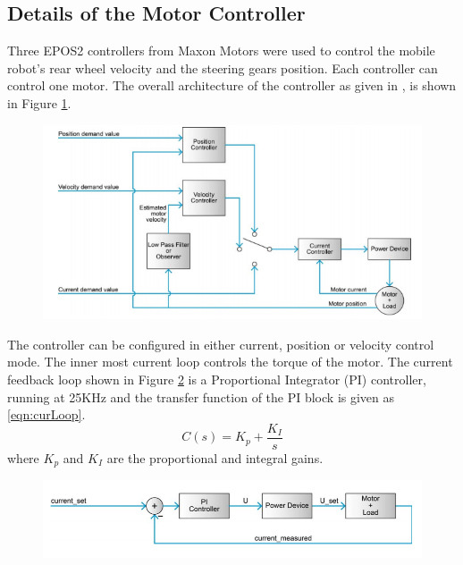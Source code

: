\subsection{Details of the Motor Controller}
Three EPOS2 controllers from Maxon Motors were used to control the mobile robot's rear wheel velocity and the steering gears position. Each controller can control one motor. The overall architecture of the controller  as given in \cite{maxonAutoTune}, \cite{maxonAppNotesPosition}  is shown  in  Figure \ref{fig:EPOS4}.
  \begin{figure}
	\includegraphics[width=\linewidth,keepaspectratio]{Chapter5/fig/overallcontorl}
	\label{fig:EPOS4} 
\end{figure}
 The controller can be configured in either current, position or velocity control mode. The inner most current loop controls the torque of the motor.
 The current feedback loop shown in Figure \ref{fig:curloop} is a Proportional Integrator (PI) controller, running at 25KHz and the transfer function of the PI block is given as \ref{eqn:curLoop}. 
 \begin{equation}
 	C(s)=K_p + \frac{K_I}{s}
 	\label{eqn:curLoop}
 \end{equation}
 where $K_p$ and $ K_I$ are the proportional and integral gains.
 
 
 \begin{figure}
 	\includegraphics[width=\linewidth,keepaspectratio]{Chapter5/fig/currentLoop}
 	\label{fig:curloop} 
 \end{figure}
 
